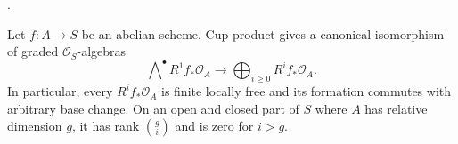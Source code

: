 \begin{lemma}
\label{lemma-abelian-scheme-cohomology-exterior}
\begin{reference}
\cite[Expos\'e 236, Remark 3.7, p. 240]{FGA}.
\end{reference}
Let $f : A \to S$ be an abelian scheme. Cup product gives a canonical
isomorphism of graded $\mathcal{O}_S$-algebras
$$
\bigwedge\nolimits^\bullet R^1f_*\mathcal{O}_A
\longrightarrow
\bigoplus_{i \geq 0}R^if_*\mathcal{O}_A.
$$
In particular, every $R^if_*\mathcal{O}_A$ is finite locally free and its
formation commutes with arbitrary base change. On an open and closed part of
$S$ where $A$ has relative dimension $g$, it has rank $\binom{g}{i}$ and is
zero for $i>g$.
\end{lemma}

